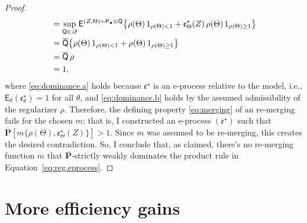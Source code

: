 \documentclass[a4paper, 12pt]{article}
\theoremstyle{plain}
\theoremstyle{definition}
\theoremstyle{remark}
\newcommand{\prob}{\mathsf{P}}
\newcommand{\E}{\mathsf{E}}
\newcommand{\prior}{\mathsf{Q}}
\newcommand{\credal}{\mathscr{Q}}
\newcommand{\uprior}{\overline{\mathsf{Q}}}
\newcommand{\uuprob}{\mathbf{\overline{P}}}
\newcommand{\eval}{\mathfrak{e}}
\begin{document}
\begin{proof}
\begin{align}
& = \sup_{\prior \in \credal} \E^{(Z,\Theta) \sim \prob_\bullet \otimes \prior} \bigl\{ \rho(\Theta) \, 1_{\rho(\Theta) < 1} + \eval_\Theta^\star(Z) \, \rho(\Theta) \, 1_{\rho(\Theta) \geq 1} \bigr\} \notag \\
& = \uprior\bigl\{ \rho(\Theta) \, 1_{\rho(\Theta) < 1} + \rho(\Theta) \, 1_{\rho(\Theta) \geq 1} \bigr\} \label{eq:dominance.a} \\
& = \uprior\,\rho \notag \\
& = 1, \label{eq:dominance.b}
\end{align}
where \eqref{eq:dominance.a} holds because $\eval^\star$ is an e-process relative to the model, i.e., $\E_\theta(\eval_\theta^\star) = 1$ for all $\theta$, and \eqref{eq:dominance.b} holds by the assumed admissibility of the regularizer $\rho$.  Therefore, the defining property \eqref{eq:merging} of an re-merging fails for the chosen $m$; that is, I constructed an e-process $(\eval^\star)$ such that $\uuprob[ m\{ \rho(\Theta), \eval_\Theta^\star(Z) \} ] > 1$.  Since $m$ was assumed to be re-merging, this creates the desired contradiction.  So, I conclude that, as claimed, there's no re-merging function $m$ that $\uuprob$-strictly weakly dominates the product rule in Equation~\eqref{eq:reg.eprocess}.  
\end{proof}



\section{More efficiency gains}
\label{S:emp.efficiency}
\end{document}
